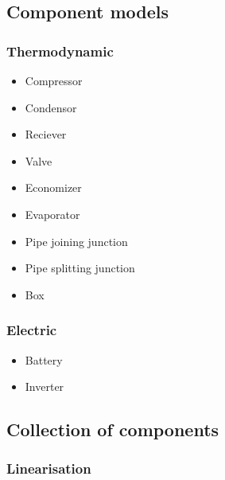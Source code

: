 \subsection{Component models}

\subsubsection{Thermodynamic}

\begin{itemize}
	\item Compressor
	\item Condensor
	\item Reciever
	\item Valve
	\item Economizer
	\item Evaporator
	\item Pipe joining junction
	\item Pipe splitting junction
	\item Box
\end{itemize}

\subsubsection{Electric}

\begin{itemize}
	\item Battery
	\item Inverter
\end{itemize}

\subsection{Collection of components}

\subsubsection{Linearisation}